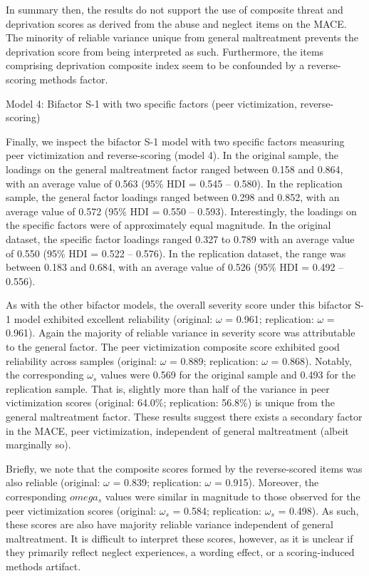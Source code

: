 \documentclass[letterpaper,man,natbib]{apa6}  %
\makeatletter
\renewcommand{\subsubsection}{\@startsection{subsubsection}{3}
  {\z@}%
  {\b@level@two@skip}{\e@level@two@skip}%
  {\normalfont\normalsize\bfseries}}
\makeatother
\begin{document}
In summary then, the results do not support the use of composite threat and deprivation scores as derived from the abuse and neglect items on the MACE. The minority of reliable variance unique from general maltreatment prevents the deprivation score from being interpreted as such. Furthermore, the items comprising deprivation composite index seem to be confounded by a reverse-scoring methods factor.

\subsubsection{Model 4: Bifactor S-1 with two specific factors (peer victimization, reverse-scoring)}

Finally, we inspect the bifactor S-1 model with two specific factors measuring peer victimization and reverse-scoring (model 4). In the original sample, the loadings on the general maltreatment factor ranged between 0.158 and 0.864, with an average value of 0.563 (95\% HDI = 0.545 -- 0.580). In the replication sample, the general factor loadings ranged between 0.298 and 0.852, with an average value of 0.572 (95\% HDI = 0.550 -- 0.593). Interestingly, the loadings on the specific factors were of approximately equal magnitude. In the original dataset, the specific factor loadings ranged 0.327 to 0.789 with an average value of 0.550 (95\% HDI = 0.522 -- 0.576). In the replication dataset, the range was between 0.183 and 0.684, with an average value of 0.526 (95\% HDI = 0.492 -- 0.556). 

As with the other bifactor models, the overall severity score under this bifactor S-1 model exhibited excellent reliability (original: $\omega$ = 0.961; replication: $\omega$ = 0.961). Again the majority of reliable variance in severity score was attributable to the general factor. The peer victimization composite score exhibited good reliability across samples (original: $\omega$ = 0.889; replication: $\omega$ = 0.868). Notably, the corresponding $\omega_s$ values were 0.569 for the original sample and 0.493 for the replication sample. That is, slightly more than half of the variance in peer victimization scores (original: 64.0\%; replication: 56.8\%) is unique from the general maltreatment factor. These results suggest there exists a secondary factor in the MACE, peer victimization, independent of general maltreatment (albeit marginally so). 

Briefly, we note that the composite scores formed by the reverse-scored items was also reliable (original: $\omega$ = 0.839; replication: $\omega$ = 0.915). Moreover, the corresponding $omega_s$ values were similar in magnitude to those observed for the peer victimization scores (original: $\omega_s$ = 0.584; replication: $\omega_s$ = 0.498). As such, these scores are also have majority reliable variance independent of general maltreatment. It is difficult to interpret these scores, however, as it is unclear if they primarily reflect neglect experiences, a wording effect, or a scoring-induced methods artifact. 
\end{document}
